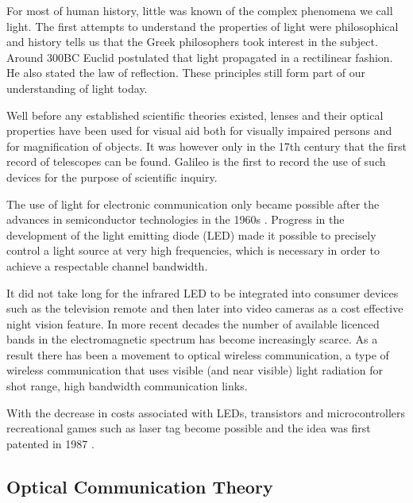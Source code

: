 For most of human history, little was known of the complex phenomena we call light. The first attempts to understand the properties of light were philosophical and history tells us that the Greek philosophers took interest in the subject. Around 300BC Euclid postulated that light propagated in a rectilinear fashion. He also stated the law of reflection. These principles still form part of our understanding of light today. \cite{Vohnsen2004}

Well before any established scientific theories existed, lenses and their optical properties have been used for visual aid both for visually impaired persons and for magnification of objects. It was however only in the 17th century that the first record of telescopes can be found. Galileo is the first to record the use of such devices for the purpose of scientific inquiry.

The use of light for electronic communication only became possible after the advances in semiconductor technologies in the 1960s \cite{Huurdeman2003}. Progress in the development of the light emitting diode (LED) made it possible to precisely control a light source at very high frequencies, which is necessary in order to achieve a respectable channel bandwidth.

It did not take long for the infrared LED to be integrated into consumer devices such as the television remote and then later into video cameras as a cost effective night vision feature. In more recent decades the number of available licenced bands in the electromagnetic spectrum has become increasingly scarce. As a result there has been a movement to optical wireless communication, a type of wireless communication that uses visible (and near visible) light radiation for shot range, high bandwidth communication links.

With the decrease in costs associated with LEDs, transistors and microcontrollers recreational games such as laser tag become possible and the idea was first patented in 1987 \cite{Carter1986}.

\subsection{Optical Communication Theory} %


